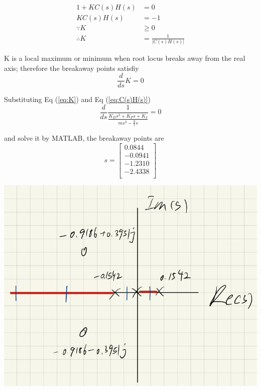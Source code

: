 \begin{questions}
\begin{solution}

   \begin{align}
   1 + K C(s)H(s) &= 0 \nonumber\\
   K C(s)H(s) &= -1 \nonumber\\
   \because K &\geq 0 \nonumber\\
   \therefore K &= \frac{1}{|C(s)H(s)|} \label{eq:K}
   \end{align}

   K is a local maximum or minimum when root locus breaks away from the real axis; therefore the breakaway points satisfiy
   \begin{equation*}
   \frac{d}{ds} K = 0
   \end{equation*}

   Substituting Eq (\ref{eq:K}) and Eq (\ref{eq:C(s)H(s)})
   \begin{equation*}
   \frac{d}{ds} \frac{1}{\frac{K_D s^2 + K_P s + K_I}{m s^3 - \frac{g}{l} s}} = 0
   \end{equation*}

   and solve it by MATLAB, the breakaway points are
   \begin{equation*}
   s =
   \begin{bmatrix}
    0.0844 \\
   -0.0941 \\
   -1.2310 \\
   -2.4338 \\
   \end{bmatrix}
   \end{equation*}

   \newpage
   \begin{minipage}[htbp]{\linewidth}
      \centering
      \includegraphics[scale=0.7]{figures/breakaway_points.png}
      \label{fig:breakaway_points}
   \end{minipage}


\end{solution}
\end{questions}
